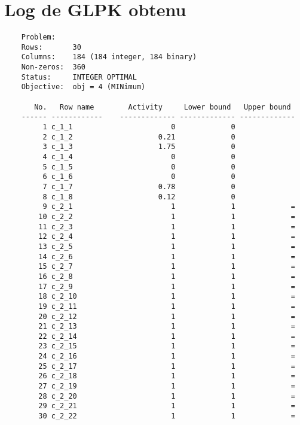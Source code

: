 \documentclass{article}[A4]
\begin{document}
\section{Log de GLPK obtenu}
\begin{verbatim}
	Problem:    
	Rows:       30
	Columns:    184 (184 integer, 184 binary)
	Non-zeros:  360
	Status:     INTEGER OPTIMAL
	Objective:  obj = 4 (MINimum)
	
	   No.   Row name        Activity     Lower bound   Upper bound
	------ ------------    ------------- ------------- -------------
		 1 c_1_1                       0             0               
		 2 c_1_2                    0.21             0               
		 3 c_1_3                    1.75             0               
		 4 c_1_4                       0             0               
		 5 c_1_5                       0             0               
		 6 c_1_6                       0             0               
		 7 c_1_7                    0.78             0               
		 8 c_1_8                    0.12             0               
		 9 c_2_1                       1             1             = 
		10 c_2_2                       1             1             = 
		11 c_2_3                       1             1             = 
		12 c_2_4                       1             1             = 
		13 c_2_5                       1             1             = 
		14 c_2_6                       1             1             = 
		15 c_2_7                       1             1             = 
		16 c_2_8                       1             1             = 
		17 c_2_9                       1             1             = 
		18 c_2_10                      1             1             = 
		19 c_2_11                      1             1             = 
		20 c_2_12                      1             1             = 
		21 c_2_13                      1             1             = 
		22 c_2_14                      1             1             = 
		23 c_2_15                      1             1             = 
		24 c_2_16                      1             1             = 
		25 c_2_17                      1             1             = 
		26 c_2_18                      1             1             = 
		27 c_2_19                      1             1             = 
		28 c_2_20                      1             1             = 
		29 c_2_21                      1             1             = 
		30 c_2_22                      1             1             = 
	

\end{verbatim}
\end{document}
